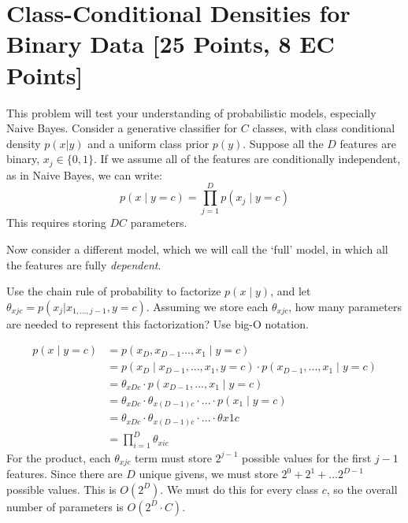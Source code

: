 

\section{Class-Conditional Densities for Binary Data [25 Points, 8 EC Points]}
This problem will test your understanding of probabilistic models, especially Naive Bayes.
Consider a generative classifier for $C$ classes, with class conditional density $p(x | y)$ and a uniform class prior $p(y)$. Suppose all the $D$ features are binary, $x_j \in \{0, 1 \}$. If we assume all of the features are conditionally independent, as in Naive Bayes, we can write:
$$p(x \mid y = c) = \prod_{j=1}^D p(x_j \mid y = c) $$
This requires storing $DC$ parameters. 

Now consider a different model, which we will call the `full' model, in which all the features are fully \textit{dependent}.

\problem[9] Use the chain rule of probability to factorize $p(x \mid y)$, and let $\theta_{xjc} = p(x_j | x_{1, \ldots, j - 1}, y = c)$. Assuming we store each $\theta_{xjc}$, how many parameters are needed to represent this factorization? Use big-O notation. 

\begin{solution}
    \begin{align*}
        p(x \mid y=c) &= p (x_D, x_{D-1} ... , x_{1} \mid y=c)\\
        &= p(x_D \mid x_{D-1}, ..., x_1, y=c) \cdot p(x_{D-1}, ..., x_{1} \mid y=c)\\
        &= \theta_{xDc} \cdot p(x_{D-1}, ..., x_{1} \mid y=c)\\
        &= \theta_{xDc} \cdot \theta_{x(D-1)c} \cdot ... \cdot p(x_1 \mid y=c)\\
        &= \theta_{xDc} \cdot \theta_{x(D-1)c} \cdot ... \cdot \theta{x1c}\\
        &= \prod_{i=1}^D \theta_{xic}
    \end{align*}
    For the product, each $\theta_{xjc}$ term must store $2^{j-1}$ possible values for the first $j-1$ features. Since there are $D$ unique givens, we must store $2^0 + 2^1 + ... 2^{D-1}$ possible values. This is $O(2^D)$. We must do this for every class $c$, so the overall number of parameters is $O(2^D \cdot C)$.
\end{solution}

